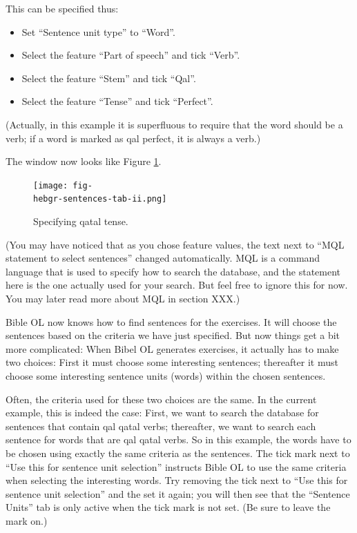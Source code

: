 \documentclass[11pt,oneside,a4paper]{memoir}
\newcommand{\hebgr}{}   %
\begin{document}
{This can be specified thus:

\begin{itemize}
  \item Set ``Sentence unit type'' to ``Word''.
  \item Select the feature ``Part of speech'' and tick ``Verb''.
  \item Select the feature ``Stem'' and tick ``Qal''.
  \item Select the feature ``Tense'' and tick ``Perfect''.
\end{itemize}

(Actually, in this example it is superfluous to require that the word should be a verb; if a word is
marked as qal perfect, it is always a verb.)

The window now looks like Figure \ref{fig-\hebgr-sentences-tab-ii}.

\begin{figure}
  \begin{center}
    \texttt{[image: fig-\\hebgr-sentences-tab-ii.png]}
  \end{center}
  \caption{Specifying qatal tense.}\label{fig-\hebgr-sentences-tab-ii}
\end{figure}


(You may have noticed that as you chose feature values, the text next to ``MQL statement to select
sentences'' changed automatically. MQL is a command language that is used to specify how to search
the database, and the statement here is the one actually used for your search. But feel free to
ignore this for now. You may later read more about MQL in section XXX.)

Bible OL now knows how to find sentences for the exercises. It will choose the sentences
based on the criteria we have just specified. But now things get a bit more complicated: When Bibel
OL generates exercises, it actually has to make two choices: First it must choose some interesting
sentences; thereafter it must choose some interesting sentence units (words) within the chosen
sentences.

Often, the criteria used for these two choices are the same. In the current example, this is indeed
the case: First, we want to search the database for sentences that contain qal qatal verbs;
thereafter, we want to search each sentence for words that are qal qatal verbs. So in this
example, the words have to be chosen using exactly the same criteria as the sentences. The tick mark
next to ``Use this for sentence unit selection'' instructs Bible OL to use the same criteria when
selecting the interesting words. Try removing the tick next to ``Use this for sentence unit
selection'' and the set it again; you will then see that the ``Sentence Units'' tab is only active
when the tick mark is not set. (Be sure to leave the mark on.)


}
\end{document}
